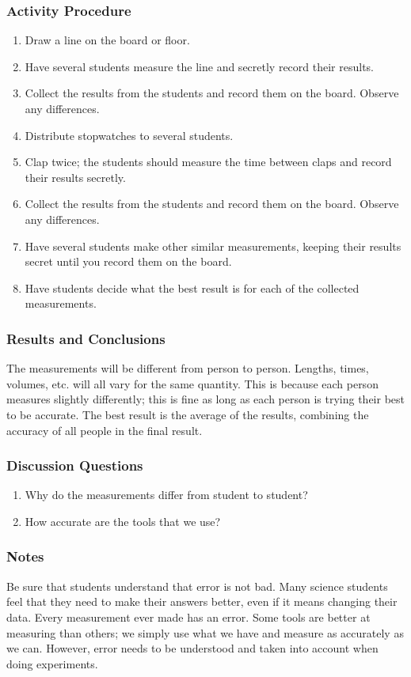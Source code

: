 \subsubsection*{Activity Procedure}
\begin{enumerate}
\item{Draw a line on the board or floor.}
\item{Have several students measure the line and secretly record their results.}
\item{Collect the results from the students and record them on the board. Observe any differences.}
\item{Distribute stopwatches to several students.}
\item{Clap twice; the students should measure the time between claps and record their results secretly.}
\item{Collect the results from the students and record them on the board. Observe any differences.}
\item{Have several students make other similar measurements, keeping their results secret until you record them on the board.}
\item{Have students decide what the best result is for each of the collected measurements.}
\end{enumerate}

\subsubsection*{Results and Conclusions}
The measurements will be different from person to person. Lengths, times, volumes, etc. will all vary for the same quantity. This is because each person measures slightly differently; this is fine as long as each person is trying their best to be accurate. The best result is the average of the results, combining the accuracy of all people in the final result.

\subsubsection*{Discussion Questions}
\begin{enumerate}
\item{Why do the measurements differ from student to student?}
\item{How accurate are the tools that we use?}
\end{enumerate}

\subsubsection*{Notes}
Be sure that students understand that error is not bad. Many science students feel that they need to make their answers better, even if it means changing their data. Every measurement ever made has an error. Some tools are better at measuring than others; we simply use what we have and measure as accurately as we can. However, error needs to be understood and taken into account when doing experiments.
